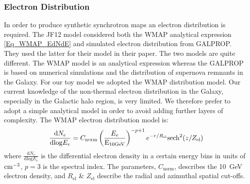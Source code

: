 \documentclass[12pt, a4 paper]{article}
\begin{document}
\subsubsection{Electron Distribution}

In order to produce synthetic synchrotron maps an electron distribution is required.
The JF12 model considered both the WMAP analytical expression \ref{Eq_WMAP_EdNdE}
and simulated electron distribution from GALPROP. They used the latter for their model in their paper.
The two models are quite different. The WMAP \cite{WMAP_Page} model is an analytical expression whereas the GALPROP \cite{Hammurabi} is based on numerical simulations and the distribution of supernova remnants in the Galaxy. For our toy model we adopted the WMAP distribution model. Our current knowledge of the non-thermal electron distribution in the Galaxy, especially in the Galactic halo region, is very limited. We therefore prefer to adopt a simple analytical model in order to avoid adding further layers of complexity. The WMAP electron distribution model is:
\begin{equation}\label{Eq_WMAP_EdNdE}
    \frac{\mathrm{d}N_e}{\mathrm{dlog}E_{e}} =     C_\mathrm{norm} \left(\frac{E_e}{\rm E_{\rm 10 GeV}}\right)^{-p+1} e^{-r/R_{\mathrm{el}}} \mathrm{sech}^2(z/Z_{\mathrm{el}}) 
\end{equation}
where $\frac{\mathrm{d}N_e}{\mathrm{dlog}E_{e}}$ is the differential electron density in a certain energy bins
in units of ${\rm cm}^{-3}$, $p =3$ is the spectral index. The parameters, $C_\mathrm{norm}$, describes the 10~GeV electron density, and $R_{\mathrm{el}}$ \& $Z_{\mathrm{el}}$ describe the radial and azimuthal spatial cut-offs. 
\end{document}
